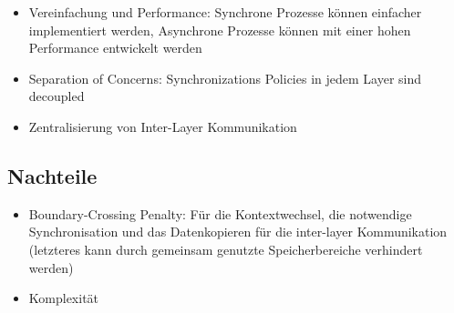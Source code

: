 \begin{itemize}
	\item Vereinfachung und Performance: Synchrone Prozesse können einfacher implementiert werden, Asynchrone Prozesse können mit einer hohen Performance entwickelt werden
	\item Separation of Concerns: Synchronizations Policies in jedem Layer sind decoupled
	\item Zentralisierung von Inter-Layer Kommunikation
\end{itemize}

\subsection*{Nachteile}

\begin{itemize}
	\item Boundary-Crossing Penalty: Für die Kontextwechsel, die notwendige Synchronisation und das Datenkopieren für die inter-layer Kommunikation (letzteres kann durch gemeinsam genutzte Speicherbereiche verhindert werden)
	\item Komplexität
\end{itemize}


